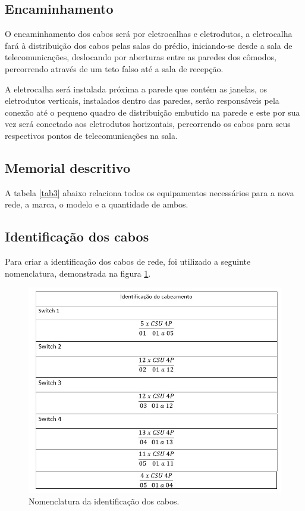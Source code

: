 \documentclass[	DIV=calc,%
							paper=a4,%
							fontsize=12pt,%
							onecolumn]{scrartcl}	 					%
\begin{document}
\subsection{Encaminhamento}
O encaminhamento dos cabos será por eletrocalhas e eletrodutos, a eletrocalha fará à distribuição dos cabos pelas salas do prédio, iniciando-se desde a sala de telecomunicações, deslocando por aberturas entre as paredes dos cômodos, percorrendo através de um teto falso até a sala de recepção. 

A eletrocalha será instalada próxima a parede que contém as janelas, os eletrodutos verticais, instalados dentro das paredes, serão responsáveis pela conexão até o pequeno quadro de distribuição embutido na parede e este por sua vez será conectado aos eletrodutos horizontais, percorrendo os cabos para seus respectivos pontos de telecomunicações na sala.

\subsection{Memorial descritivo}

A tabela \ref{tab3} abaixo relaciona todos os equipamentos necessários para a nova rede, a marca, o modelo e a quantidade de ambos.

 
\newpage

\subsection{Identificação dos cabos}
Para criar a identificação dos cabos de rede, foi utilizado a seguinte nomenclatura, demonstrada na figura \ref{identificacaorede}.

\begin{figure}[h]
	\centering
	\includegraphics[scale=0.7]{identificacaorede}
	\caption{Nomenclatura da identificação dos cabos.}
	\label{identificacaorede}
\end{figure}
\end{document}
